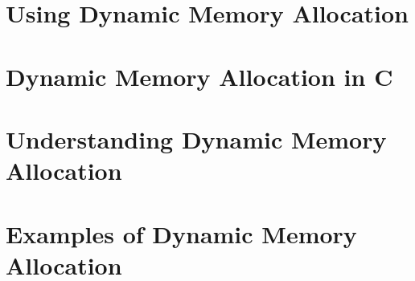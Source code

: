 
\clearpage
\section{Using Dynamic Memory Allocation} %
\label{sec:using_dynamic_memory_allocation}




\clearpage
\def\pageLang{c}
\section{Dynamic Memory Allocation in C} %
\label{sec:dynamic_memory_allocation_in_c}









\clearpage
\def\pageLang{none}
\section{Understanding Dynamic Memory Allocation} %
\label{sec:understanding_dynamic_memory_allocation}


\clearpage
\section{Examples of Dynamic Memory Allocation} %
\label{sec:examples_of_dynamic_memory_allocation}

